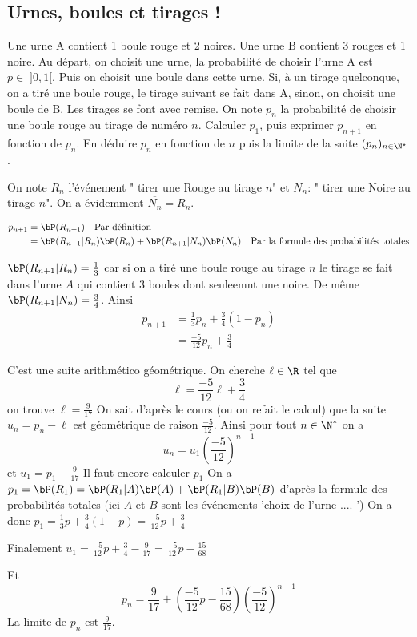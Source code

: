 \subsection{Urnes, boules et tirages ! }
\begin{exercice}   \;
Une urne A contient 1 boule rouge et 2 noires. Une urne B contient 3 rouges et 1 noire. Au d\'epart, on choisit une urne, la probabilit\'e de choisir l'urne A est $p\in \; \rbrack 0,1\lbrack$. Puis on choisit une boule dans cette urne. Si, \`a un tirage quelconque, on a tir\'e une boule rouge, le tirage suivant se fait dans A, sinon, on choisit une boule de B. Les tirages se font avec remise. On note $p_n$ la probabilit\'e de choisir une boule rouge au tirage de num\'ero $n$. Calculer $p_1$, puis exprimer $p_{n+1}$ en fonction de $p_n$. En d\'eduire $p_n$ en fonction de $n$ puis la limite de la suite $(p_n)_{n\in\N^{\star}}$.
\end{exercice}
\begin{correction}
On note $R_n$ l'événement " tirer une Rouge au tirage $n$" et $N_n$: " tirer une Noire au tirage $n$". On a évidemment $\overline{N_n} =R_n$. 

\begin{align*}
p_{n+1} &= \bP(R_{n+1} ) \quad \text{Par définition} \\
			&= \bP(R_{n+1}  | R_n ) \bP(R_n) +   \bP(R_{n+1}  | N_n ) \bP(N_n)  \quad \text{Par la formule des probabilités totales} 
\end{align*}

$\bP(R_{n+1}  | R_n ) =\frac{1}{3}$  car si on a tiré une boule rouge au tirage $n$ le tirage se fait dans l'urne $A$ qui contient 3 boules dont seuleemnt une noire. De même $\bP(R_{n+1}  | N_n ) =\frac{3}{4}$.
Ainsi
\begin{align*}
p_{n+1} &= \frac{1}{3}p_n + \frac{3}{4}(1-p_n)\\
			&= \frac{-5}{12} p_n + \frac{3}{4}
\end{align*}

C'est une suite arithmético géométrique. On cherche $\ell\in \R$ tel que 
$$\ell =  \frac{-5}{12} \ell+ \frac{3}{4}$$
on trouve $\ell = \frac{9}{17}$
On sait d'après le cours (ou  on refait le calcul) que la suite $u_n=p_n - \ell  $ est géométrique de raison $\frac{-5}{12}$. 
Ainsi pour tout $n\in \N^*$ on a 
$$u_n = u_1 \left(\frac{-5}{12} \right)^{n-1}$$
et $u_1 = p_1- \frac{9}{17} $
Il faut encore calculer $p_1$ 
On a $p_1= \bP(R_1) = \bP(R_1|A) \bP(A) +  \bP(R_1|B) \bP(B)$ d'après la formule des probabilités totales (ici $A$ et $B$ sont les événements 'choix de l'urne .... ') 
On a donc $p_1 = \frac{1}{3}p +\frac{3}{4}(1-p)= \frac{-5}{12} p + \frac{3}{4}$

Finalement $u_1= \frac{-5}{12} p + \frac{3}{4} - \frac{9}{17}=  \frac{-5}{12} p-\frac{15}{68}$

Et $$p_n = \frac{9}{17}  + \left(\frac{-5}{12} p-\frac{15}{68}\right) \left(\frac{-5}{12} \right)^{n-1}$$
La limite de $p_n$ est $\frac{9}{17}$.

\end{correction}
